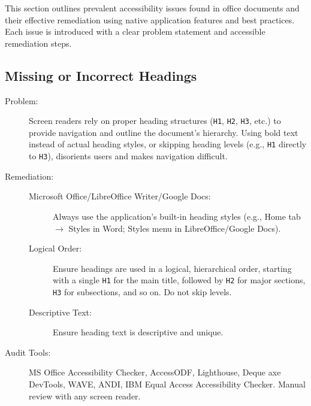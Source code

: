 This section outlines prevalent accessibility issues found in office documents and their effective remediation using native application features and best practices. Each issue is introduced with a clear problem statement and accessible remediation steps.

\subsection{Missing or Incorrect Headings}
\label{subsec:missing-headings}
\begin{description}
    \item[Problem:] Screen readers rely on proper heading structures (\texttt{H1}, \texttt{H2}, \texttt{H3}, etc.) to provide navigation and outline the document's hierarchy. Using bold text instead of actual heading styles, or skipping heading levels (e.g., \texttt{H1} directly to \texttt{H3}), disorients users and makes navigation difficult.
    \item[Remediation:]
    \begin{description}
        \item[Microsoft Office/LibreOffice Writer/Google Docs:] Always use the application's built-in heading styles (e.g., Home tab $\rightarrow$ Styles in Word; Styles menu in LibreOffice/Google Docs).
        \item[Logical Order:] Ensure headings are used in a logical, hierarchical order, starting with a single \texttt{H1} for the main title, followed by \texttt{H2} for major sections, \texttt{H3} for subsections, and so on. Do not skip levels.
        \item[Descriptive Text:] Ensure heading text is descriptive and unique.
    \end{description}
    \item[Audit Tools:] MS Office Accessibility Checker, AccessODF, Lighthouse, Deque axe DevTools, WAVE, ANDI, IBM Equal Access Accessibility Checker. Manual review with any screen reader.
\end{description}

